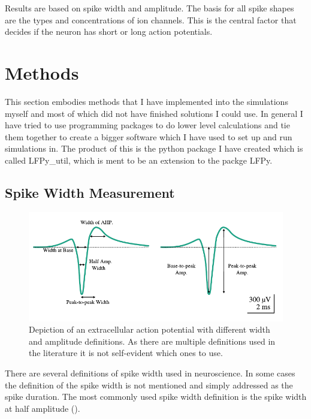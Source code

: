 \documentclass[altfont, fleqn]{uiophd}
\begin{document}
Results are based on spike width and amplitude.
The basis for all spike shapes are the types and concentrations of
ion channels.
This is the central factor that decides if the neuron has short or long action potentials.

\chapter{Methods}
This section embodies methods that I have implemented into
the simulations myself and most of which did not 
have finished solutions I could use. 
In general I have tried to use programming packages to
do lower level calculations and tie them together to create
a bigger software which I have used to set up and run 
simulations in. 
The product of this is the python package I have created
which is called LFPy\_util, which is ment to be an extension
to the packge LFPy. 

\vspace{1em} 
\startcontents
{}
\section{Spike Width Measurement}
\begin{figure}[h]
    \centering
    \includegraphics[width=1.0\textwidth]{images/sec_3/ap_eap.pdf}
    \caption{Depiction of an extracellular action potential with
    different width and amplitude definitions. 
    As there are multiple definitions used in the literature
    it is not self-evident which ones to use. 
    }
    \label{fig:3_ap_eap}
\end{figure}
There
are several definitions of spike width used in neuroscience. 
In some cases the definition of the spike width is not mentioned
and simply addressed as the spike duration. 
The most commonly used spike width definition is the spike width at half 
amplitude
(\textcite{bean_action_2007}).
\end{document}
